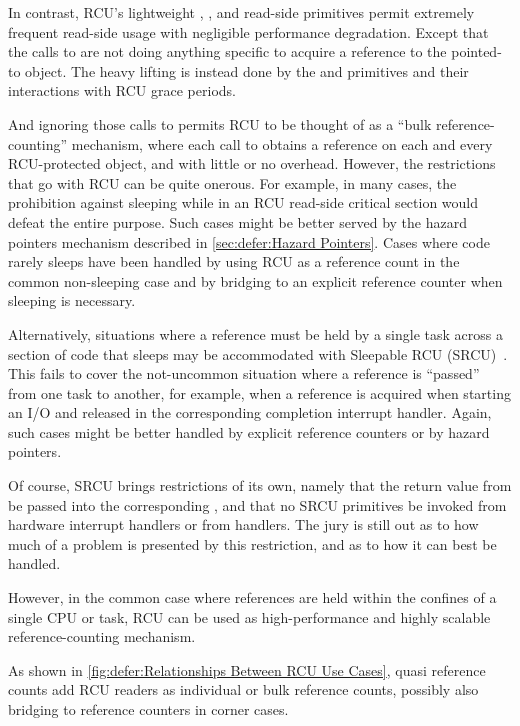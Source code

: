 In contrast, RCU's lightweight ,
, and  read-side primitives
permit extremely frequent read-side usage with negligible performance
degradation.
Except that the calls to  are not doing anything
specific to acquire a reference to the pointed-to object.
The heavy lifting is instead done by the  and
 primitives and their interactions with RCU
grace periods.

And ignoring those calls to  permits RCU to be
thought of as a ``bulk reference-counting'' mechanism, where each call
to  obtains a reference on each and every RCU-protected
object, and with little or no overhead.
However, the restrictions that go with RCU can be quite onerous.
For example, in many cases, the prohibition against sleeping while in an RCU
read-side critical section would defeat the entire purpose.
Such cases might be better served by the hazard pointers mechanism
described in \cref{sec:defer:Hazard Pointers}.
Cases where code rarely sleeps have been handled by using RCU as a
reference count in the common non-sleeping case and by bridging
to an explicit reference counter when sleeping is necessary.

Alternatively, situations where a reference must be held by a single task
across a section of code that sleeps may be accommodated with Sleepable
RCU (SRCU)~\cite{PaulEMcKenney2006c}.
This fails to cover the not-uncommon situation where a reference is ``passed''
from one task to another, for example, when a reference is acquired
when starting an I/O and released in the corresponding completion
interrupt handler.
Again, such cases might be better handled by explicit reference counters
or by hazard pointers.

Of course, SRCU brings restrictions of its own, namely that the
return value from  be passed into the
corresponding , and that no SRCU primitives
be invoked from hardware interrupt handlers or from 
handlers.
The jury is still out as to how much of a problem is presented by
this restriction, and as to how it can best be handled.

However, in the common case where references are held within the confines
of a single CPU or task, RCU can be used as high-performance and highly
scalable reference-counting mechanism.

As shown in \cref{fig:defer:Relationships Between RCU Use Cases},
quasi reference counts add RCU readers as individual or bulk
reference counts, possibly also bridging to reference counters
in corner cases.

